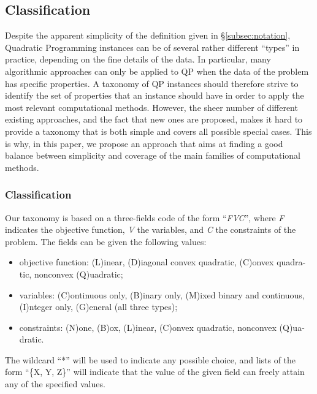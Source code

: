 

\subsection{Classification}\label{sec:classification}

Despite the apparent simplicity of the definition given in \S \ref{subsec:notation}, Quadratic Programming instances can be of several rather different ``types'' in practice, depending on the fine details of the data. In particular, many algorithmic approaches can only be applied to QP when the data of the problem has specific properties. A taxonomy of QP instances should therefore strive to identify the set of properties that an instance should have in order to apply the most relevant computational methods. However, the sheer number of different existing approaches, and the fact that new ones are proposed, makes it hard to provide a taxonomy that is both simple and covers all possible special cases. This is why, in this paper, we propose an approach that aims at finding a good balance between simplicity and coverage of the main families of computational methods.

\subsubsection{Classification}\label{ssec:taxonomy}

Our taxonomy is based on a three-fields code of the form ``\textit{FVC}'', where \textit{F} indicates the objective function, \textit{V} the variables, and \textit{C} the constraints of the problem. The fields can be given the following values:
%
\begin{itemize}
 \item objective function: (L)inear, (D)iagonal convex quadratic, (C)onvex quadra-tic, nonconvex (Q)uadratic;
 \item variables: (C)ontinuous only, (B)inary only, (M)ixed binary and continuous, (I)nteger only, (G)eneral (all three types);
 \item constraints: (N)one, (B)ox, (L)inear, (C)onvex quadratic, nonconvex (Q)ua-dratic.
\end{itemize}
%
The wildcard ``*'' will be used to indicate any possible choice, and lists of the form ``\{X, Y, Z\}'' will indicate that the value of the given field can freely attain any of the specified values.

